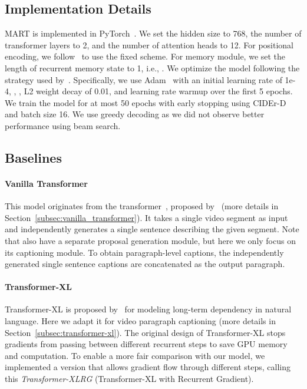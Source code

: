 \documentclass[11pt,a4paper]{article}
\begin{document}
\subsection{Implementation Details}
MART is implemented in PyTorch~\cite{paszke2017automatic}. We set the hidden size to 768, the number of transformer layers to 2, and the number of attention heads to 12. For positional encoding, we follow~\citet{vaswani2017attention} to use the fixed scheme. For memory module, we set the length of recurrent memory state to 1, i.e., .
We optimize the model following the strategy used by~\citet{devlin2018bert}. 
Specifically, we use Adam~\cite{kingma2014adam} with an initial learning rate of 1e-4, , , L2 weight decay of 0.01, and learning rate warmup over the first 5 epochs.
We train the model for at most 50 epochs with early stopping using CIDEr-D and batch size 16. We use greedy decoding as we did not observe better performance using beam search.

\subsection{Baselines}
\paragraph{Vanilla Transformer} 
This model originates from the transformer~\cite{vaswani2017attention}, proposed by~\citet{zhou2018end} (more details in Section~\ref{subsec:vanilla_transformer}). 
It takes a single video segment as input and independently generates a single sentence describing the given segment. 
Note that \citet{zhou2018end} also have a separate proposal generation module, but here we only focus on its captioning module. 
To obtain paragraph-level captions, the independently generated single sentence captions are concatenated as the output paragraph.

\paragraph{Transformer-XL} 
Transformer-XL is proposed by~\citet{dai2019transformer} for modeling long-term dependency in natural language. Here we adapt it for video paragraph captioning (more details in Section~\ref{subsec:transformer-xl}). 
The original design of Transformer-XL stops gradients from passing between different recurrent steps to save GPU memory and computation. To enable a more fair comparison with our model, we implemented a version that allows gradient flow through different steps, calling this \textit{Transformer-XLRG} (Transformer-XL with Recurrent Gradient). 
\end{document}
